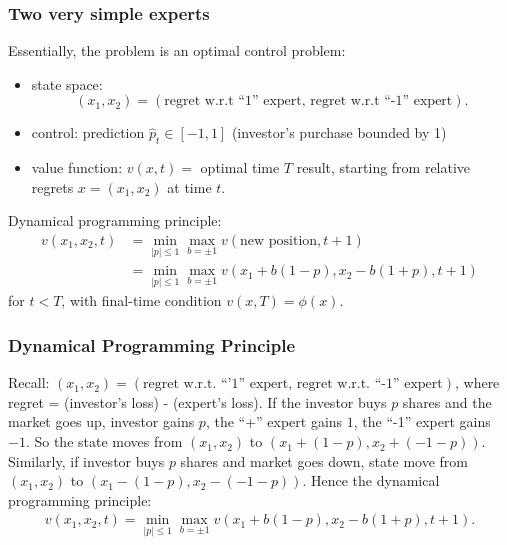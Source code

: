 \documentclass{beamer}
\begin{document}
\begin{frame}
\frametitle{Two very simple experts}
Essentially,  the problem is an optimal control problem:
\begin{itemize}
\item {\color{red}state space:}$$(x_1,x_2) = (\text{regret w.r.t ``1'' expert, regret w.r.t ``-1'' expert}).$$
\item {\color{red}control:} prediction $\hat{p}_t\in[-1,1]$ ({\color{blue}investor's purchase bounded by 1}) 
\item {\color{red}value function:} $v(x,t) = $ optimal time $T$ result, starting from relative regrets $x = (x_1,x_2)$ at time $t$. 
\end{itemize}

{\color{red}Dynamical programming principle:}
\begin{align*}
v(x_1,x_2,t) &= \min_{|p|\le 1}\max_{b = \pm 1}v(\text{new position},t+1)\\
                    & = \min_{|p|\le 1}\max_{b = \pm 1}v(x_1 + b(1-p),x_2-b(1+p),t+1)		
\end{align*}
for $t<T$, with final-time condition $v(x,T) = \phi(x).$

\end{frame}

\begin{frame}
\frametitle{Dynamical Programming Principle}
Recall: {\color{red}$(x_1,x_2) = (\text{regret w.r.t. ``'1'' expert, regret w.r.t. ``-1'' expert})$}, where regret  = (investor's loss) - (expert's loss).
\vfill
If the investor buys ${p}$ shares and the market goes up, investor gains ${p}$, the 
``+'' expert gains $1$, the ``-1'' expert gains $-1$. So the state moves from $(x_1,x_2)$ to $(x_1+(1-{p}),x_2+(-1-{p})).$
\vfill
Similarly, if investor buys ${p}$ shares  and market goes down, state move from $(x_1,x_2)$ to $(x_1-(1-{p}),x_2-(-1-{p})).$
\vfill
Hence the dynamical programming principle:
 \begin{align*}
 v(x_1,x_2,t) = \min_{|p|\le 1}\max_{b = \pm 1}v(x_1 + b(1-p),x_2-b(1+p),t+1).
 \end{align*}

\end{frame}
\end{document}
